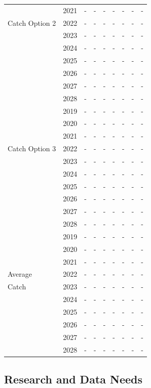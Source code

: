 \documentclass[12pt,]{article}
\begin{document}
\begin{table}[ht]
{\begin{tabular}{l|cc|>{\centering}p{.7in}c|>{\centering}p{.7in}c|>{\centering}p{.7in}c}
   & 2021 & - & - & - & - & - & - & - \\ 
  Catch Option 2 & 2022 & - & - & - & - & - & - & - \\ 
   & 2023 & - & - & - & - & - & - & - \\ 
   & 2024 & - & - & - & - & - & - & - \\ 
   & 2025 & - & - & - & - & - & - & - \\ 
   & 2026 & - & - & - & - & - & - & - \\ 
   & 2027 & - & - & - & - & - & - & - \\ 
   & 2028 & - & - & - & - & - & - & - \\ 
   \hline
 & 2019 & - & - & - & - & - & - & - \\ 
   & 2020 & - & - & - & - & - & - & - \\ 
   & 2021 & - & - & - & - & - & - & - \\ 
  Catch Option 3 & 2022 & - & - & - & - & - & - & - \\ 
   & 2023 & - & - & - & - & - & - & - \\ 
   & 2024 & - & - & - & - & - & - & - \\ 
   & 2025 & - & - & - & - & - & - & - \\ 
   & 2026 & - & - & - & - & - & - & - \\ 
   & 2027 & - & - & - & - & - & - & - \\ 
   & 2028 & - & - & - & - & - & - & - \\ 
   \hline
 & 2019 & - & - & - & - & - & - & - \\ 
   & 2020 & - & - & - & - & - & - & - \\ 
   & 2021 & - & - & - & - & - & - & - \\ 
  Average & 2022 & - & - & - & - & - & - & - \\ 
  Catch & 2023 & - & - & - & - & - & - & - \\ 
   & 2024 & - & - & - & - & - & - & - \\ 
   & 2025 & - & - & - & - & - & - & - \\ 
   & 2026 & - & - & - & - & - & - & - \\ 
   & 2027 & - & - & - & - & - & - & - \\ 
   & 2028 & - & - & - & - & - & - & - \\ 
   \hline
\end{tabular}
}
\end{table}

\FloatBarrier

\subsection*{Research and Data Needs}\label{research-and-data-needs}
\end{document}
